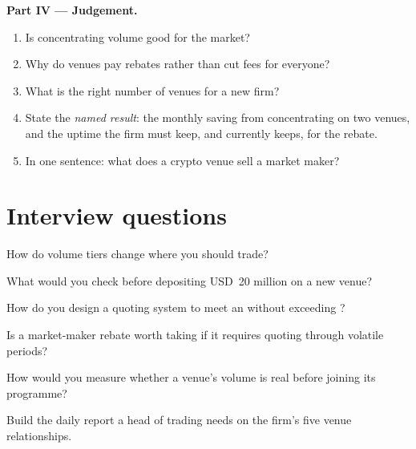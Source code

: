 \begin{problem}
\medskip\noindent\textbf{Part IV --- Judgement.}
\begin{enumerate}[resume]
\item Is concentrating volume good for the market?
\item Why do venues pay rebates rather than cut fees for everyone?
\item What is the right number of venues for a new firm?
\item State the \emph{named result}: the monthly saving from concentrating on two venues, and the uptime the firm must keep, and currently keeps, for the rebate.
\item In one sentence: what does a crypto venue sell a market maker?
\end{enumerate}
\end{problem}

\section{Interview questions}

\begin{interviewq}\label{iq:m3:getting-access-crypto-venues:1}
How do volume tiers change where you should trade?
\end{interviewq}

\begin{interviewq}\label{iq:m3:getting-access-crypto-venues:2}
What would you check before depositing USD~20 million on a new venue?
\end{interviewq}

\begin{interviewq}\label{iq:m3:getting-access-crypto-venues:3}
How do you design a quoting system to meet an  without exceeding ?
\end{interviewq}

\begin{interviewq}\label{iq:m3:getting-access-crypto-venues:4}
Is a market-maker rebate worth taking if it requires quoting through volatile periods?
\end{interviewq}

\begin{interviewq}\label{iq:m3:getting-access-crypto-venues:5}
How would you measure whether a venue's volume is real before joining its programme?
\end{interviewq}

\begin{interviewq}\label{iq:m3:getting-access-crypto-venues:6}
Build the daily report a head of trading needs on the firm's five venue relationships.
\end{interviewq}

